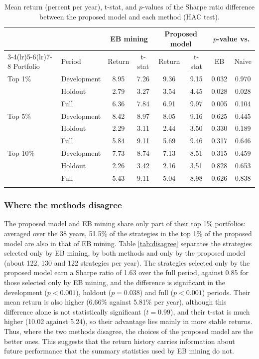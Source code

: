 \documentclass[pdflatex,sn-mathphys-num]{sn-jnl}%
\theoremstyle{thmstyleone}%
\theoremstyle{thmstyletwo}%
\theoremstyle{thmstylethree}%
\begin{document}
\begin{table}[h]
\caption{Mean return (percent per year), t-stat, and $p$-values of the Sharpe ratio difference between the proposed model and each method (HAC test).}\label{tab:selection}%
\small
\begin{tabular}{@{}llcccccc@{}}
\toprule
 & & \multicolumn{2}{c}{EB mining} & \multicolumn{2}{c}{Proposed model} & \multicolumn{2}{c}{$p$-value vs.} \\
\cmidrule(lr){3-4}\cmidrule(lr){5-6}\cmidrule(lr){7-8}
Portfolio & Period & Return & t-stat & Return & t-stat & EB & Naive \\
\midrule
Top 1\%  & Development & 8.95 & 7.26 & 9.36 & 9.15 & 0.032 & 0.970 \\
         & Holdout     & 2.79 & 3.27 & 3.54 & 4.45 & 0.028 & 0.028 \\
         & Full        & 6.36 & 7.84 & 6.91 & 9.97 & 0.005 & 0.104 \\
Top 5\%  & Development & 8.42 & 8.97 & 8.05 & 9.16 & 0.625 & 0.445 \\
         & Holdout     & 2.29 & 3.11 & 2.44 & 3.50 & 0.330 & 0.189 \\
         & Full        & 5.84 & 9.11 & 5.69 & 9.46 & 0.317 & 0.646 \\
Top 10\% & Development & 7.73 & 8.74 & 7.13 & 8.51 & 0.315 & 0.459 \\
         & Holdout     & 2.26 & 3.42 & 2.16 & 3.51 & 0.828 & 0.653 \\
         & Full        & 5.43 & 9.11 & 5.04 & 8.98 & 0.626 & 0.838 \\
\botrule
\end{tabular}
\end{table}

\subsubsection{Where the methods disagree}
The proposed model and EB mining share only part of their top 1\% portfolios: averaged over the 38 years, 51.5\% of the strategies in the top 1\% of the proposed model are also in that of EB mining. Table \ref{tab:disagree} separates the strategies selected only by EB mining, by both methods and only by the proposed model (about 122, 130 and 122 strategies per year). The strategies selected only by the proposed model earn a Sharpe ratio of 1.63 over the full period, against 0.85 for those selected only by EB mining, and the difference is significant in the development ($p < 0.001$), holdout ($p = 0.038$) and full ($p < 0.001$) periods. Their mean return is also higher (6.66\% against 5.81\% per year), although this difference alone is not statistically significant ($t = 0.99$), and their t-stat is much higher (10.02 against 5.24), so their advantage lies mainly in more stable returns. Thus, where the two methods disagree, the choices of the proposed model are the better ones. This suggests that the return history carries information about future performance that the summary statistics used by EB mining do not.
\end{document}
